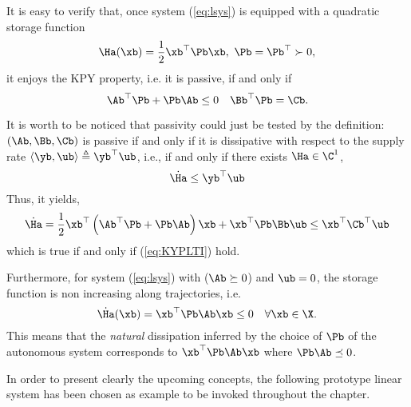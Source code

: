 {
It is easy to verify that, once system (\ref{eq:lsys}) is equipped with a quadratic storage function 
\begin{equation}
    \Ha(\xb) = \frac{1}{2}\xb^\top \Pb\xb,~\Pb = \Pb^\top \succ 0,
\end{equation}
it enjoys the KPY property, i.e. it is passive, if and only if
%
\begin{equation}\label{eq:KYPLTI}
        \Ab^\top \Pb + \Pb\Ab \leq 0\quad
        \Bb^\top \Pb = \Cb.
\end{equation}
%
\begin{rem}
    It is worth to be noticed that passivity could just be tested by the definition:
    $(\Ab,\Bb,\Cb)$ is passive if and only if it is dissipative with respect to the supply rate $\langle \yb,\ub \rangle\triangleq \yb^\top \ub$, i.e.,  if and only if there exists $\Ha\in\C^1$,
    \begin{equation}
        \dot{\Ha}\leq \yb^\top \ub
    \end{equation}
    Thus, it yields,
    \begin{align*}
        \dot{\Ha} =  \frac{1}{2}\xb^\top \left(\Ab^\top \Pb + \Pb\Ab\right)\xb + \xb^\top \Pb\Bb\ub \leq \xb^\top \Cb^\top \ub
    \end{align*}
    which is true if and only if (\ref{eq:KYPLTI}) hold.
\end{rem}
%
Furthermore, for system (\ref{eq:lsys}) with ($\Ab\succeq0$) and $\ub=0$, the storage function is non increasing along trajectories, i.e.
%
\begin{equation*}
    \dot{\Ha}(\xb) =  \xb^\top \Pb\Ab\xb \leq 0\quad\forall \xb\in\X.
\end{equation*}
%
This means that the \textit{natural} dissipation inferred by the choice of $\Pb$ of the autonomous system corresponds to $\xb^\top \Pb\Ab\xb$ where $\Pb\Ab\preceq0$. 

}
%
In order to present clearly the upcoming concepts, the following prototype linear system has been chosen as example to be invoked throughout the chapter.
%
